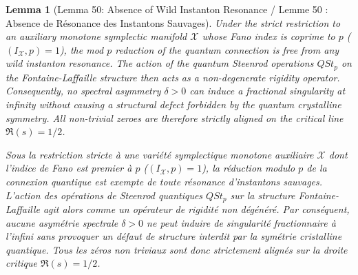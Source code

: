 \documentclass[11pt,a4paper]{article}
\newtheorem{lemma}[theorem]{Lemma}
\theoremstyle{definition}
\begin{document}
\begin{lemma}[Lemma 50: Absence of Wild Instanton Resonance / Lemme 50 : Absence de Résonance des Instantons Sauvages]
Under the strict restriction to an auxiliary monotone symplectic manifold $\mathcal{X}$ whose Fano index is coprime to $p$ ($(I_{\mathcal{X}}, p) = 1$), the mod $p$ reduction of the quantum connection is free from any wild instanton resonance. The action of the quantum Steenrod operations $QSt_p$ on the Fontaine-Laffaille structure then acts as a non-degenerate rigidity operator. Consequently, no spectral asymmetry $\delta > 0$ can induce a fractional singularity at infinity without causing a structural defect forbidden by the quantum crystalline symmetry. All non-trivial zeroes are therefore strictly aligned on the critical line $\Re(s) = 1/2$.

\textit{Sous la restriction stricte à une variété symplectique monotone auxiliaire $\mathcal{X}$ dont l'indice de Fano est premier à $p$ ($(I_{\mathcal{X}}, p) = 1$), la réduction modulo $p$ de la connexion quantique est exempte de toute résonance d'instantons sauvages. L'action des opérations de Steenrod quantiques $QSt_p$ sur la structure Fontaine-Laffaille agit alors comme un opérateur de rigidité non dégénéré. Par conséquent, aucune asymétrie spectrale $\delta > 0$ ne peut induire de singularité fractionnaire à l'infini sans provoquer un défaut de structure interdit par la symétrie cristalline quantique. Tous les zéros non triviaux sont donc strictement alignés sur la droite critique $\Re(s) = 1/2$.}
\end{lemma}
\end{document}
